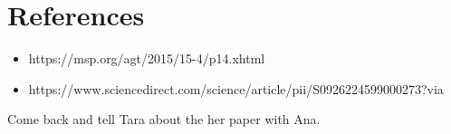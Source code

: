 \documentclass[12pt]{article}
\begin{document}

\section{References}
\begin{itemize}
	\item https://msp.org/agt/2015/15-4/p14.xhtml
	\item https://www.sciencedirect.com/science/article/pii/S0926224599000273?via%
\end{itemize}
Come back and tell Tara about the her paper with Ana.
\end{document}
